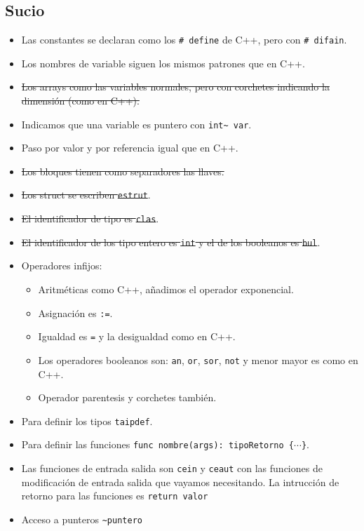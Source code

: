 \documentclass[10pt,a4paper]{article}
\begin{document}
\subsection{Sucio}
\begin{itemize}
    \item Las constantes se declaran como los \texttt{\# define} de C++, pero con \texttt{\# difain}.
    \item Los nombres de variable siguen los mismos patrones que en C++.
    \item \sout{Los arrays como las variables normales, pero con corchetes indicando la dimensión (como en C++).}
    \item Indicamos que una variable es puntero con \texttt{int\~{}  var}.
    \item Paso por valor y por referencia igual que en C++.
    \item \sout{Los bloques tienen como separadores las llaves.}
    \item \sout{Los struct se escriben \texttt{estrut}}.
    \item \sout{El identificador de tipo es \texttt{clas}}.
    \item \sout{El identificador de los tipo entero es \texttt{int} y el de los booleanos es \texttt{bul}}.
    \item Operadores infijos:
    \begin{itemize}
        \item Aritméticas como C++, añadimos el operador exponencial.
        \item Asignación es \texttt{:=}.
        \item Igualdad es \texttt{=} y la desigualdad como en C++.
        \item Los operadores booleanos son: \texttt{an}, \texttt{or}, \texttt{sor}, \texttt{not} y menor mayor es como en C++.
        \item Operador parentesis y corchetes también.
    \end{itemize}
    \item Para definir los tipos \texttt{taipdef}.
    \item Para definir las funciones \texttt{func nombre(args): tipoRetorno \{$\cdots$\}}.
    \item Las funciones de entrada salida son \texttt{cein} y \texttt{ceaut} con las funciones de modificación de entrada salida que vayamos necesitando. La intrucción de retorno para las funciones es \texttt{return valor}
    \item Acceso a punteros \texttt{\~{}puntero}

\end{itemize}
\end{document}
